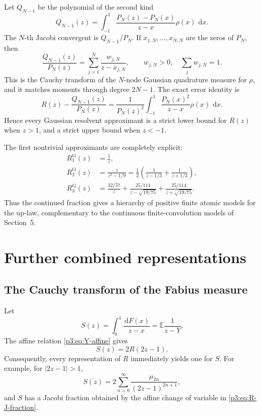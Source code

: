 \documentclass[11pt,oneside]{article}
\theoremstyle{definition}
\newcommand{\dd}{\,\mathrm d}
\newcommand{\E}{\mathbb E}
\begin{document}
Let \(Q_{N-1}\) be the polynomial of the second kind
\begin{equation}
 Q_{N-1}(z)=\int_{-1}^{1}
 \frac{P_N(z)-P_N(x)}{z-x}\rho(x)\,\dd x.                    \label{p3:eq:second-kind}
\end{equation}
The \(N\)-th Jacobi convergent is \(Q_{N-1}/P_N\).  If
\(x_{1,N},\dots,x_{N,N}\) are the zeros of \(P_N\), then
\begin{equation}
 \boxed{
 \frac{Q_{N-1}(z)}{P_N(z)}
 =\sum_{j=1}^{N}\frac{w_{j,N}}{z-x_{j,N}},
 \qquad w_{j,N}>0,\quad \sum_jw_{j,N}=1.
 }                                                           \label{p3:eq:gauss-partial}
\end{equation}
This is the Cauchy transform of the \(N\)-node Gaussian quadrature measure for \(\rho\),
and it matches moments through degree \(2N-1\).  The exact error identity is
\begin{equation}
 R(z)-\frac{Q_{N-1}(z)}{P_N(z)}
 =\frac1{P_N(z)^2}\int_{-1}^{1}
 \frac{P_N(x)^2}{z-x}\rho(x)\,\dd x.                        \label{p3:eq:Markov-error}
\end{equation}
Hence every Gaussian resolvent approximant is a strict lower bound for \(R(z)\) when
\(z>1\), and a strict upper bound when \(z<-1\).

The first nontrivial approximants are completely explicit:
\begin{align}
 R_1^{\mathrm G}(z)&=\frac1z,\\
 R_2^{\mathrm G}(z)&=\frac{z}{z^2-1/9}
 =\frac12\left(\frac1{z-1/3}+\frac1{z+1/3}\right),\\
 R_3^{\mathrm G}(z)&=
 \frac{32/57}{z}
 +\frac{25/114}{z-\sqrt{19/75}}
 +\frac{25/114}{z+\sqrt{19/75}}.
\end{align}
Thus the continued fraction gives a hierarchy of positive finite atomic models for the
up-law, complementary to the continuous finite-convolution models of Section~5.

\section{Further combined representations}

\subsection{The Cauchy transform of the Fabius measure}

Let
\begin{equation}
 S(z)=\int_0^1\frac{\dd F(x)}{z-x}=\E\frac1{z-Y}.            \label{p3:eq:S-def}
\end{equation}
The affine relation \eqref{p3:eq:Y-affine} gives
\begin{equation}
 \boxed{S(z)=2R(2z-1).}                                     \label{p3:eq:S-R}
\end{equation}
Consequently, every representation of \(R\) immediately yields one for \(S\).  For example,
for \(|2z-1|>1\),
\begin{equation}
 S(z)=2\sum_{n=0}^{\infty}\frac{\mu_{2n}}{(2z-1)^{2n+1}},   \label{p3:eq:S-moment}
\end{equation}
and \(S\) has a Jacobi fraction obtained by the affine change of variable in
\eqref{p3:eq:R-J-fraction}.
\end{document}

